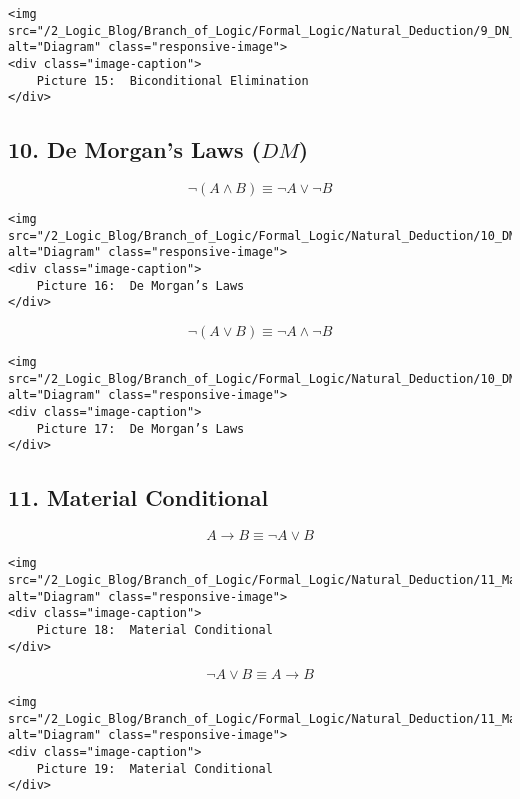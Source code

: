 \begin{verbatim}
<img src="/2_Logic_Blog/Branch_of_Logic/Formal_Logic/Natural_Deduction/9_DN_Elim.png" alt="Diagram" class="responsive-image">
<div class="image-caption">
    Picture 15:  Biconditional Elimination
</div>
\end{verbatim}

\subsection{\texorpdfstring{10. De Morgan's Laws
(\(DM\))}{10. De Morgan's Laws (DM)}}\label{de-morgans-laws-dm}

\[\neg (A\land B) \equiv \neg A \lor \neg B\]

\begin{verbatim}
<img src="/2_Logic_Blog/Branch_of_Logic/Formal_Logic/Natural_Deduction/10_DM.png" alt="Diagram" class="responsive-image">
<div class="image-caption">
    Picture 16:  De Morgan’s Laws
</div>
\end{verbatim}

\[\neg (A\lor B) \equiv \neg A \land \neg B\]

\begin{verbatim}
<img src="/2_Logic_Blog/Branch_of_Logic/Formal_Logic/Natural_Deduction/10_DM2.png" alt="Diagram" class="responsive-image">
<div class="image-caption">
    Picture 17:  De Morgan’s Laws
</div>
\end{verbatim}

\subsection{11. Material Conditional}\label{material-conditional}

\[ A \rightarrow B \equiv \neg A \lor B\]

\begin{verbatim}
<img src="/2_Logic_Blog/Branch_of_Logic/Formal_Logic/Natural_Deduction/11_Material.png" alt="Diagram" class="responsive-image">
<div class="image-caption">
    Picture 18:  Material Conditional
</div>
\end{verbatim}

\[ \neg A \lor B  \equiv A \rightarrow B\]

\begin{verbatim}
<img src="/2_Logic_Blog/Branch_of_Logic/Formal_Logic/Natural_Deduction/11_Material2.png" alt="Diagram" class="responsive-image">
<div class="image-caption">
    Picture 19:  Material Conditional
</div>
\end{verbatim}

